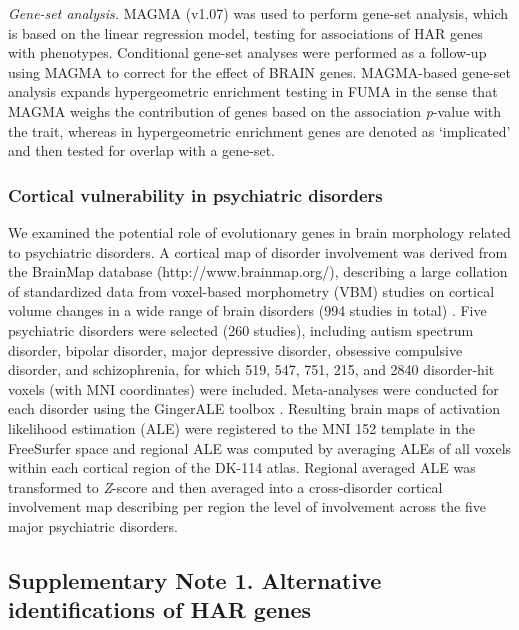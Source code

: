 \begin{refsection}
\noindent
\textit{Gene-set analysis. }MAGMA (v1.07) \citep{de2015magma} was used to perform gene-set analysis, which is based on the linear regression model, testing for associations of HAR genes with phenotypes. Conditional gene-set analyses were performed as a follow-up using MAGMA to correct for the effect of BRAIN genes. MAGMA-based gene-set analysis expands hypergeometric enrichment testing in FUMA \citep{watanabe2017functional} in the sense that MAGMA weighs the contribution of genes based on the association \textit{p}-value with the trait, whereas in hypergeometric enrichment genes are denoted as ‘implicated’ and then tested for overlap with a gene-set. 

\subsubsection*{Cortical vulnerability in psychiatric disorders}
We examined the potential role of evolutionary genes in brain morphology related to psychiatric disorders. A cortical map of disorder involvement was derived from the BrainMap database (http://www.brainmap.org/), describing a large collation of standardized data from voxel-based morphometry (VBM) studies on cortical volume changes in a wide range of brain disorders (994 studies in total) \citep{Fox2002MappingCA,Fox2005BrainMapTO,Vanasse2018BrainMapVA}. Five psychiatric disorders were selected (260 studies), including autism spectrum disorder, bipolar disorder, major depressive disorder, obsessive compulsive disorder, and schizophrenia, for which 519, 547, 751, 215, and 2840 disorder-hit voxels (with MNI coordinates) were included. Meta-analyses were conducted for each disorder using the GingerALE toolbox \citep{Eickhoff2009CoordinatebasedAL,Turkeltaub2012MinimizingWA}. Resulting brain maps of activation likelihood estimation (ALE) were registered to the MNI 152 template in the FreeSurfer space and regional ALE was computed by averaging ALEs of all voxels within each cortical region of the DK-114 atlas. Regional averaged ALE was transformed to \textit{Z}-score and then averaged into a cross-disorder cortical involvement map describing per region the level of involvement across the five major psychiatric disorders.

\subsection*{Supplementary Note 1. Alternative identifications of HAR genes}

\end{refsection}
